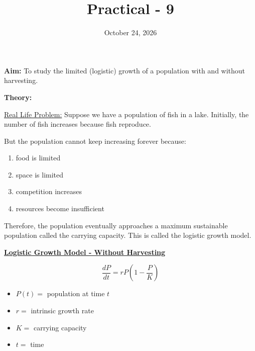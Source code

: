\documentclass{article}
\title{\textbf{{Practical - 9}}}
\author{}
\date{October 24, 2026}
\begin{document}
\maketitle

\noindent
\textbf{\large{Aim:}} To study the limited (logistic) growth of a population with and without harvesting.

\vspace{1em}
\noindent
\textbf{\large{Theory:}}

\noindent
\underline{Real Life Problem:} Suppose we have a population of fish in a lake. Initially, the number of fish increases because fish reproduce. 

\noindent
But the population cannot keep increasing forever because:
\begin{enumerate}
\item food is limited
\item space is limited
\item competition increases
\item resources become insufficient
\end{enumerate}
Therefore, the population eventually approaches a maximum sustainable population called the carrying capacity. This is called the logistic growth model.

\vspace{1em}
\begin{center}
    \textbf{\underline{Logistic Growth Model - Without Harvesting}}
\end{center}
\[\frac{dP}{dt} = rP(1 - \frac{P}{K})\]
\begin{itemize}
    \item $P(t) =$ population at time $t$
    \item $r =$ intrinsic growth rate
    \item $K =$ carrying capacity
    \item $t =$ time
\end{itemize}
\noindent{}

\vspace{1em}
\end{document}

